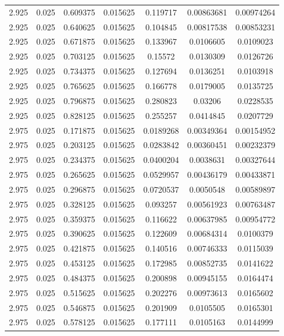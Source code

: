 \begin{table}[bh]
\begin{center}
{\begin{tabular}{ccccccc}
2.925	 & 0.025 & 	0.609375	 & 0.015625	 & 0.119717	 & 0.00863681	 & 0.00974264 \\ 
2.925	 & 0.025 & 	0.640625	 & 0.015625	 & 0.104845	 & 0.00817538	 & 0.00853231 \\ 
2.925	 & 0.025 & 	0.671875	 & 0.015625	 & 0.133967	 & 0.0106605	 & 0.0109023 \\ 
2.925	 & 0.025 & 	0.703125	 & 0.015625	 & 0.15572	 & 0.0130309	 & 0.0126726 \\ 
2.925	 & 0.025 & 	0.734375	 & 0.015625	 & 0.127694	 & 0.0136251	 & 0.0103918 \\ 
2.925	 & 0.025 & 	0.765625	 & 0.015625	 & 0.166778	 & 0.0179005	 & 0.0135725 \\ 
2.925	 & 0.025 & 	0.796875	 & 0.015625	 & 0.280823	 & 0.03206	 & 0.0228535 \\ 
2.925	 & 0.025 & 	0.828125	 & 0.015625	 & 0.255257	 & 0.0414845	 & 0.0207729 \\ 
2.975	 & 0.025 & 	0.171875	 & 0.015625	 & 0.0189268	 & 0.00349364	 & 0.00154952 \\ 
2.975	 & 0.025 & 	0.203125	 & 0.015625	 & 0.0283842	 & 0.00360451	 & 0.00232379 \\ 
2.975	 & 0.025 & 	0.234375	 & 0.015625	 & 0.0400204	 & 0.0038631	 & 0.00327644 \\ 
2.975	 & 0.025 & 	0.265625	 & 0.015625	 & 0.0529957	 & 0.00436179	 & 0.00433871 \\ 
2.975	 & 0.025 & 	0.296875	 & 0.015625	 & 0.0720537	 & 0.0050548	 & 0.00589897 \\ 
2.975	 & 0.025 & 	0.328125	 & 0.015625	 & 0.093257	 & 0.00561923	 & 0.00763487 \\ 
2.975	 & 0.025 & 	0.359375	 & 0.015625	 & 0.116622	 & 0.00637985	 & 0.00954772 \\ 
2.975	 & 0.025 & 	0.390625	 & 0.015625	 & 0.122609	 & 0.00684314	 & 0.0100379 \\ 
2.975	 & 0.025 & 	0.421875	 & 0.015625	 & 0.140516	 & 0.00746333	 & 0.0115039 \\ 
2.975	 & 0.025 & 	0.453125	 & 0.015625	 & 0.172985	 & 0.00852735	 & 0.0141622 \\ 
2.975	 & 0.025 & 	0.484375	 & 0.015625	 & 0.200898	 & 0.00945155	 & 0.0164474 \\ 
2.975	 & 0.025 & 	0.515625	 & 0.015625	 & 0.202276	 & 0.00973613	 & 0.0165602 \\ 
2.975	 & 0.025 & 	0.546875	 & 0.015625	 & 0.201909	 & 0.0105505	 & 0.0165301 \\ 
2.975	 & 0.025 & 	0.578125	 & 0.015625	 & 0.177111	 & 0.0105163	 & 0.0144999 \\ 

\end{tabular}}
\end{center}
\end{table}

